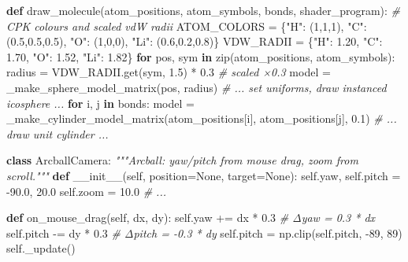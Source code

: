 \documentclass[
  11pt,
]{report}
\newenvironment{Shaded}{}{}
\newcommand{\BuiltInTok}[1]{\textcolor[rgb]{0.00,0.50,0.00}{#1}}
\newcommand{\CommentTok}[1]{\textcolor[rgb]{0.38,0.63,0.69}{\textit{#1}}}
\newcommand{\ControlFlowTok}[1]{\textcolor[rgb]{0.00,0.44,0.13}{\textbf{#1}}}
\newcommand{\DecValTok}[1]{\textcolor[rgb]{0.25,0.63,0.44}{#1}}
\newcommand{\FloatTok}[1]{\textcolor[rgb]{0.25,0.63,0.44}{#1}}
\newcommand{\FunctionTok}[1]{\textcolor[rgb]{0.02,0.16,0.49}{#1}}
\newcommand{\KeywordTok}[1]{\textcolor[rgb]{0.00,0.44,0.13}{\textbf{#1}}}
\newcommand{\NormalTok}[1]{#1}
\newcommand{\OperatorTok}[1]{\textcolor[rgb]{0.40,0.40,0.40}{#1}}
\newcommand{\StringTok}[1]{\textcolor[rgb]{0.25,0.44,0.63}{#1}}
\newcommand{\VariableTok}[1]{\textcolor[rgb]{0.10,0.09,0.49}{#1}}
\begin{document}
\begin{Shaded}
\begin{Highlighting}[]
\KeywordTok{def}\NormalTok{ draw\_molecule(atom\_positions, atom\_symbols, bonds, shader\_program):}
    \CommentTok{\# CPK colours and scaled vdW radii}
\NormalTok{    ATOM\_COLORS }\OperatorTok{=}\NormalTok{ \{}\StringTok{"H"}\NormalTok{: (}\DecValTok{1}\NormalTok{,}\DecValTok{1}\NormalTok{,}\DecValTok{1}\NormalTok{), }\StringTok{"C"}\NormalTok{: (}\FloatTok{0.5}\NormalTok{,}\FloatTok{0.5}\NormalTok{,}\FloatTok{0.5}\NormalTok{), }\StringTok{"O"}\NormalTok{: (}\DecValTok{1}\NormalTok{,}\DecValTok{0}\NormalTok{,}\DecValTok{0}\NormalTok{), }\StringTok{"Li"}\NormalTok{: (}\FloatTok{0.6}\NormalTok{,}\FloatTok{0.2}\NormalTok{,}\FloatTok{0.8}\NormalTok{)\}}
\NormalTok{    VDW\_RADII   }\OperatorTok{=}\NormalTok{ \{}\StringTok{"H"}\NormalTok{: }\FloatTok{1.20}\NormalTok{, }\StringTok{"C"}\NormalTok{: }\FloatTok{1.70}\NormalTok{, }\StringTok{"O"}\NormalTok{: }\FloatTok{1.52}\NormalTok{, }\StringTok{"Li"}\NormalTok{: }\FloatTok{1.82}\NormalTok{\}}
    \ControlFlowTok{for}\NormalTok{ pos, sym }\KeywordTok{in} \BuiltInTok{zip}\NormalTok{(atom\_positions, atom\_symbols):}
\NormalTok{        radius }\OperatorTok{=}\NormalTok{ VDW\_RADII.get(sym, }\FloatTok{1.5}\NormalTok{) }\OperatorTok{*} \FloatTok{0.3}   \CommentTok{\# scaled ×0.3}
\NormalTok{        model }\OperatorTok{=}\NormalTok{ \_make\_sphere\_model\_matrix(pos, radius)}
        \CommentTok{\# ... set uniforms, draw instanced icosphere ...}
    \ControlFlowTok{for}\NormalTok{ i, j }\KeywordTok{in}\NormalTok{ bonds:}
\NormalTok{        model }\OperatorTok{=}\NormalTok{ \_make\_cylinder\_model\_matrix(atom\_positions[i], atom\_positions[j], }\FloatTok{0.1}\NormalTok{)}
        \CommentTok{\# ... draw unit cylinder ...}


\KeywordTok{class}\NormalTok{ ArcballCamera:}
    \CommentTok{"""Arcball: yaw/pitch from mouse drag, zoom from scroll."""}
    \KeywordTok{def} \FunctionTok{\_\_init\_\_}\NormalTok{(}\VariableTok{self}\NormalTok{, position}\OperatorTok{=}\VariableTok{None}\NormalTok{, target}\OperatorTok{=}\VariableTok{None}\NormalTok{):}
        \VariableTok{self}\NormalTok{.yaw, }\VariableTok{self}\NormalTok{.pitch }\OperatorTok{=} \OperatorTok{{-}}\FloatTok{90.0}\NormalTok{, }\FloatTok{20.0}
        \VariableTok{self}\NormalTok{.zoom }\OperatorTok{=} \FloatTok{10.0}
        \CommentTok{\# ...}

    \KeywordTok{def}\NormalTok{ on\_mouse\_drag(}\VariableTok{self}\NormalTok{, dx, dy):}
        \VariableTok{self}\NormalTok{.yaw   }\OperatorTok{+=}\NormalTok{ dx }\OperatorTok{*} \FloatTok{0.3}               \CommentTok{\# Δyaw = 0.3 * dx}
        \VariableTok{self}\NormalTok{.pitch }\OperatorTok{{-}=}\NormalTok{ dy }\OperatorTok{*} \FloatTok{0.3}               \CommentTok{\# Δpitch = {-}0.3 * dy}
        \VariableTok{self}\NormalTok{.pitch  }\OperatorTok{=}\NormalTok{ np.clip(}\VariableTok{self}\NormalTok{.pitch, }\OperatorTok{{-}}\DecValTok{89}\NormalTok{, }\DecValTok{89}\NormalTok{)}
        \VariableTok{self}\NormalTok{.\_update()}


\end{Highlighting}
\end{Shaded}
\end{document}
